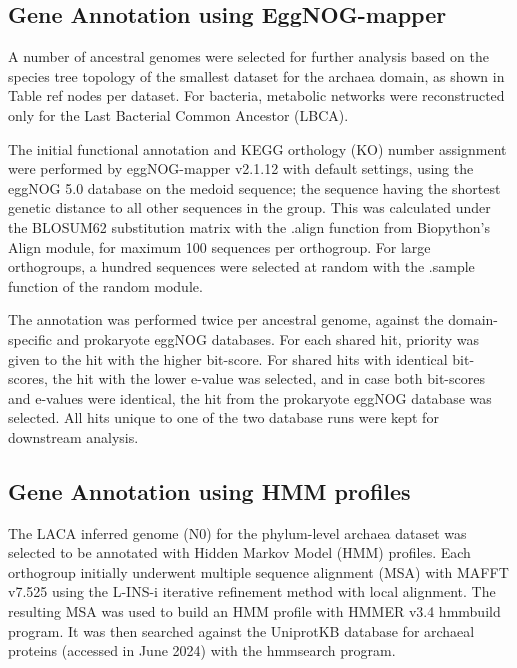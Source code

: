 \subsection*{Gene Annotation using EggNOG-mapper}


A number of ancestral genomes were selected for further analysis based on the species tree topology of the smallest dataset for the archaea domain, as shown in Table ref nodes per dataset. For bacteria, metabolic networks were reconstructed only for the Last Bacterial Common Ancestor (LBCA).

The initial functional annotation and KEGG orthology (KO) number assignment were performed by eggNOG-mapper v2.1.12 \cite{cantalapiedra2021} with default settings, using the eggNOG 5.0 database \cite{huerta-cepas2019} on the medoid sequence; the sequence having the shortest genetic distance to all other sequences in the group. This was calculated under the BLOSUM62 substitution matrix with the .align function from Biopython's Align module, for maximum 100 sequences per orthogroup. For large orthogroups, a hundred sequences were selected at random with the .sample function of the random module. 

The annotation was performed twice per ancestral genome, against the domain-specific and prokaryote eggNOG databases. For each shared hit, priority was given to the hit with the higher bit-score. For shared hits with identical bit-scores, the hit with the lower e-value was selected, and in case both bit-scores and e-values were identical, the hit from the prokaryote eggNOG database was selected. All hits unique to one of the two database runs were kept for downstream analysis. 


\subsection*{Gene Annotation using HMM profiles}


The LACA inferred genome (N0) for the phylum-level archaea dataset was selected to be annotated with Hidden Markov Model (HMM) profiles. Each orthogroup initially underwent multiple sequence alignment (MSA) with MAFFT v7.525 \cite{katoh2013} using the L-INS-i iterative refinement method with local alignment. The resulting MSA was used to build an HMM profile with HMMER v3.4 hmmbuild program. It was then searched against the UniprotKB database \cite{theuniprotconsortium2023} for archaeal proteins (accessed in June 2024) with the hmmsearch program.


